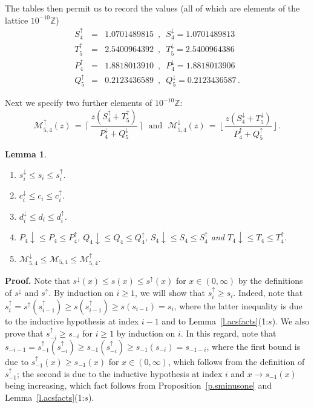 \documentclass[letterpaper,11pt,oneside,reqno]{amsbook}
\newcommand{\Z}{\ensuremath{\mathbb{Z}}}
\numberwithin{figure}{chapter}
\newtheorem{lemma}[theorem]{Lemma}
\theoremstyle{definition}
\theoremstyle{definition}
\theoremstyle{definition}
\theoremstyle{definition}
\theoremstyle{definition}
\newcommand{\minamm}{\mathcal{M}}
\begin{document}
The tables then permit us to record the values (all of which are elements of the lattice $10^{-10}\Z$)
\begin{eqnarray}
 S_4^\uparrow & = & 1.0701489815 \, \, \, , \, \, \, S_4^\downarrow =  1.0701489813 \label{e.stpqvalues} \\
 T_5^\uparrow& = & 2.5400964392  \, \, \, , \, \, \,
  T_5^\downarrow = 2.5400964386 \nonumber \\
  P_4^\uparrow & = &  1.8818013910  \, \, \, , \, \, \,
   P_4^\downarrow =1.8818013906  \nonumber \\
   Q_5^\uparrow & = &  0.2123436589  \, \, \, , \, \, \,
   Q_5^\downarrow =   0.2123436587 \, .  \nonumber
\end{eqnarray}

  
   
 Next we specify two further elements of $10^{-10}\Z$:
  \begin{equation}\label{e.rupdown}
 \minamm^\uparrow_{5,4}(z) \, = \,  \biggl\lceil \,  \frac{z(S^\uparrow_4+T^\uparrow_5)}{P^\downarrow_4 + Q^\downarrow_5}  \, \biggr\rceil  \, \, \, \, \textrm{and} \, \, \, \, 
 \minamm^\downarrow_{5,4}(z) \, = \,   \biggl\lfloor \, \frac{z(S^\downarrow_4+T^\downarrow_5)}{P^\uparrow_4 + Q^\uparrow_5} \, \biggr\rfloor \, .
 \end{equation}
  
 \begin{lemma}\label{l.fiveshort}
 \begin{enumerate}
 Let $i \in \Z$.
 \item $s_i^\downarrow \leq s_i \leq s_i^\uparrow$.
 \item $c_i^\downarrow \leq c_i \leq c_i^\uparrow$.
 \item $d_i^\downarrow \leq d_i \leq d_i^\uparrow$.
 \item $P_4 \downarrow \leq P_4 \leq P_4^\uparrow$,  $Q_4 \downarrow \leq Q_4 \leq Q_4^\uparrow$, $S_4 \downarrow \leq S_4 \leq S_4^\uparrow$ and $T_4 \downarrow \leq T_4 \leq T_4^\uparrow$.
 \item $\minamm_{5,4}^\downarrow \leq \minamm_{5,4} \leq \minamm_{5,4}^\uparrow$.
 \end{enumerate}
 \end{lemma}
{\bf Proof.} Note that $s^\downarrow(x) \leq s(x) \leq s^\uparrow(x)$ for $x \in (0,\infty)$ by the definitions of $s^\downarrow$ and $s^\uparrow$. By induction on $i \geq 1$,
we will show that $s_i^\uparrow \geq s_i$. Indeed, note that $s_i^\uparrow = s^\uparrow(s_{i-1}^\uparrow) \geq s(s_{i-1}^\uparrow) \geq s(s_{i-1}) = s_i$, where the latter inequality is due to the inductive hypothesis at index $i-1$ and to Lemma~\ref{l.acsfacts}(1:$s$).
We also prove that $s_{-i}^\uparrow \geq s_{-i}$ for $i \geq 1$ by induction on $i$. In this regard, note that $s_{-i-1} = s_{-1}^\uparrow(s_{-i}^\uparrow) \geq s_{-1}(s_{-i}^\uparrow) \geq s_{-1}(s_{-i}) = s_{-1-i}$, where the first bound is due to $s_{-1}^\uparrow(x) \geq s_{-1}(x)$ for $x \in (0,\infty)$, which follows from the definition of $s_{-1}^\uparrow$; the second  is due to the inductive hypothesis at index $i$ and $x \to s_{-1}(x)$ being increasing, which fact follows from  Proposition~\ref{p.sminusone} and Lemma~\ref{l.acsfacts}(1:$s$).
\end{document}
